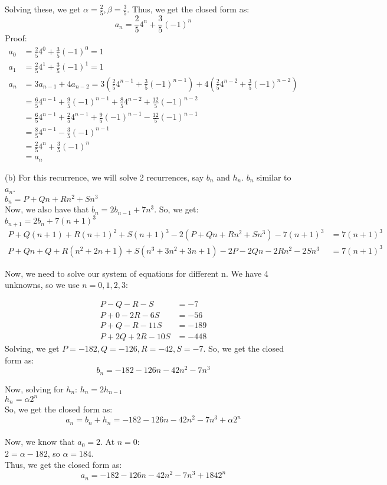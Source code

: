 \documentclass[a4paper]{article}
\begin{document}
\begin{enumerate}
Solving these, we get $\alpha = \frac{2}{5}, \beta = \frac{3}{5}$. Thus, we get the closed form as:
$$a_n = \frac{2}{5}4^n + \frac{3}{5}(-1)^n$$
Proof:
\begin{align*}
    a_0 &= \frac{2}{5}4^0 + \frac{3}{5}(-1)^0 = 1\\
    a_1 &= \frac{2}{5}4^1 + \frac{3}{5}(-1)^1 = 1\\
    a_n &= 3a_{n-1} + 4a_{n-2} = 3(\frac{2}{5}4^{n-1} + \frac{3}{5}(-1)^{n-1}) + 4(\frac{2}{5}4^{n-2} + \frac{3}{5}(-1)^{n-2})\\
    &= \frac{6}{5}4^{n-1} + \frac{9}{5}(-1)^{n-1} + \frac{8}{5}4^{n-2} + \frac{12}{5}(-1)^{n-2}\\
    &= \frac{6}{5}4^{n-1} + \frac{2}{5}4^{n-1} + \frac{9}{5}(-1)^{n-1} - \frac{12}{5}(-1)^{n-1}\\
    &= \frac{8}{5}4^{n-1} - \frac{3}{5}(-1)^{n-1}\\
    &= \frac{2}{5}4^n + \frac{3}{5}(-1)^n\\
    &= a_n
\end{align*}

(b) For this recurrence, we will solve 2 recurrences, say $b_n$ and $h_n$. $b_n$ similar to $a_n$.\\

$b_n = P + Qn + Rn^2 + Sn^3$\\
Now, we also have that $b_n = 2b_{n-1} + 7n^3$. So, we get:\\
$b_{n+1} = 2b_n + 7(n+1)^3$\\
\begin{align*}
P + Q(n+1)+R(n+1)^2 + S(n+1)^3 - 2(P + Qn + Rn^2 + Sn^3) - 7(n+1)^3 &= 7(n+1)^3\\
P + Qn + Q + R(n^2 + 2n + 1) + S(n^3 + 3n^2 + 3n + 1) - 2P - 2Qn - 2Rn^2 -2Sn^3 &= 7(n+1)^3
\end{align*}

Now, we need to solve our system of equations for different n. We have 4 unknowns, so we use $n= 0, 1, 2, 3$:

\begin{align*}
    P - Q - R - S &= -7\\
    P + 0 - 2R -6S &= -56\\
    P + Q - R - 11S &= -189\\
    P + 2Q + 2R - 10S &= -448
\end{align*}
Solving, we get $P = -182, Q=-126, R=-42, S=-7$. So, we get the closed form as:
$$b_n = -182 - 126n - 42n^2 - 7n^3$$

Now, solving for $h_n$:
$h_n = 2h_{n-1}$\\
$h_n = \alpha 2^n$\\

So, we get the closed form as:
$$a_n = b_n + h_n = -182 - 126n - 42n^2 - 7n^3 + \alpha  2^n$$\\
Now, we know that $a_0 = 2$. At $n=0$:\\
$2 = \alpha - 182$, so $\alpha = 184$.\\

Thus, we get the closed form as:
$$a_n = -182 - 126n - 42n^2 - 7n^3 + 184  2^n$$

\newpage

\end{enumerate} 
\end{document}
